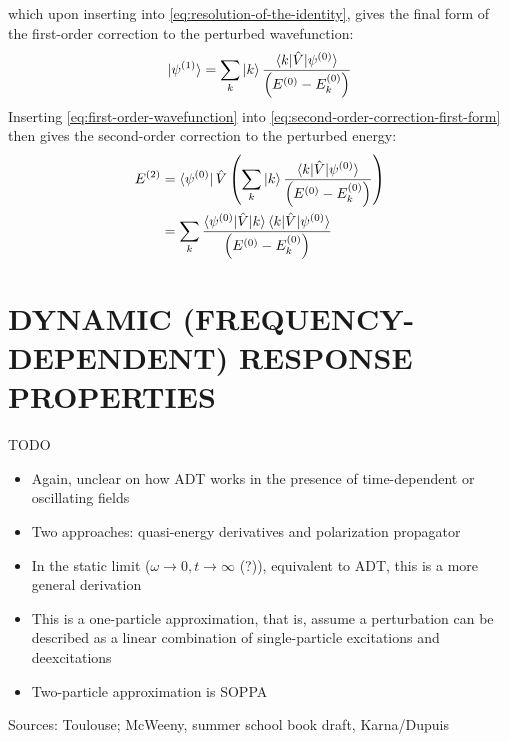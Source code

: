 \documentclass[%
class = book,%
crop = false,%
float = true,%
multi = true,%
preview = false,%
]{standalone}
\newcommand{\caps}[1]{\uppercase{#1}}
\begin{document}
which upon inserting into \eqref{eq:resolution-of-the-identity}, gives the final form of the first-order correction to the perturbed wavefunction:
\begin{equation}
  \label{eq:first-order-wavefunction}
  \ket{\psi^{(1)}} = \sum_{k} \ket{k} \frac{\braket{k|\hat{V}|\psi^{(0)}}}{\left( E^{(0)} - E_{k}^{(0)} \right)}
\end{equation}
Inserting \eqref{eq:first-order-wavefunction} into \eqref{eq:second-order-correction-first-form} then gives the second-order correction to the perturbed energy:
\begin{equation}
  \label{eq:second-order-energy}
  \begin{aligned}
    E^{(2)} &= \bra{\psi^{(0)}} \hat{V} \left( \sum_{k} \ket{k} \frac{\braket{k|\hat{V}|\psi^{(0)}}}{\left( E^{(0)} - E_{k}^{(0)} \right)} \right) \\
    &= \sum_{k} \frac{\braket{\psi^{(0)}|\hat{V}|k}\braket{k|\hat{V}|\psi^{(0)}}}{\left( E^{(0)} - E_{k}^{(0)} \right)}
  \end{aligned}
\end{equation}
\section{\texorpdfstring{\caps{Dynamic (frequency-dependent) response properties}}{Static (time-independent) response properties}}
\label{sec:dynamic-properties}

TODO

\begin{itemize}
\item Again, unclear on how ADT works in the presence of time-dependent or oscillating fields
\item Two approaches: quasi-energy derivatives and polarization propagator
\item In the static limit (\(\omega \rightarrow 0, t \rightarrow \infty\) (?)), equivalent to ADT, this is a more general derivation
\item This is a one-particle approximation, that is, assume a perturbation can be described as a linear combination of single-particle excitations and deexcitations
\item Two-particle approximation is SOPPA
\end{itemize}

Sources: Toulouse; McWeeny, summer school book draft, Karna/Dupuis

\end{document}
